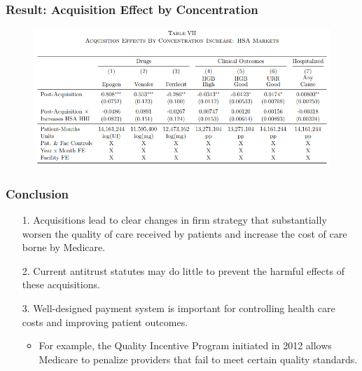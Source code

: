 \documentclass[aspectratio=169]{beamer}
\begin{document}
\begin{frame}\frametitle{Result: Acquisition Effect by Concentration}
\setlength{\leftmargini}{12pt}
\vspace{-7.5mm}
 \begin{figure}[h!]
        \centering
        \includegraphics[width=130mm]{figure3_7.png}
        \label{fig:method}
        \end{figure}
        \vspace{-9.5mm}

\end{frame}

\begin{frame}\frametitle{Conclusion}
\setlength{\leftmargini}{12pt}

\begin{itemize}
    \item [1.] Acquisitions lead to clear changes in firm strategy that substantially worsen the quality of care received by patients and increase the cost of care borne by Medicare.
    \item [2.] Current antitrust statutes may do little to prevent the harmful effects of these acquisitions.
    \item [3.] Well-designed payment system is important for controlling health care costs and improving patient outcomes. 
    \begin{itemize}
        \item For example, the Quality Incentive Program initiated in 2012 allows Medicare to penalize providers that fail to meet certain quality standards.
    \end{itemize}
\end{itemize}


\end{frame}
\end{document}
